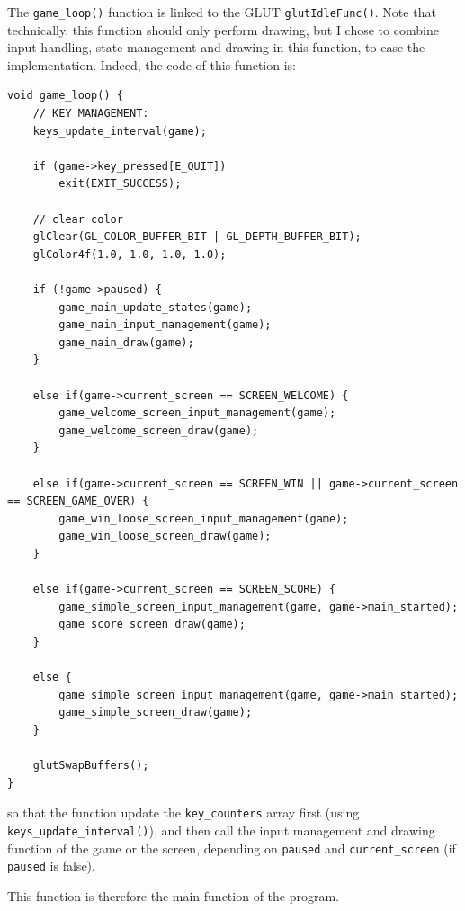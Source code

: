 \documentclass[12pt,a4paper]{article}
\newcommand{\cc}[1]{\texttt{#1}}
\begin{document}
The \cc{game_loop()} function is linked to the GLUT \cc{glutIdleFunc()}. Note that technically, this function should only perform drawing, but I chose to combine input handling, state management and drawing in this function, to ease the implementation. Indeed, the code of this function is:\begin{verbatim}
void game_loop() {
    // KEY MANAGEMENT:
    keys_update_interval(game);

    if (game->key_pressed[E_QUIT])
        exit(EXIT_SUCCESS);

    // clear color
    glClear(GL_COLOR_BUFFER_BIT | GL_DEPTH_BUFFER_BIT);
    glColor4f(1.0, 1.0, 1.0, 1.0);

    if (!game->paused) {
        game_main_update_states(game);
        game_main_input_management(game);
        game_main_draw(game);
    }

    else if(game->current_screen == SCREEN_WELCOME) {
        game_welcome_screen_input_management(game);
        game_welcome_screen_draw(game);
    }

    else if(game->current_screen == SCREEN_WIN || game->current_screen == SCREEN_GAME_OVER) {
        game_win_loose_screen_input_management(game);
        game_win_loose_screen_draw(game);
    }

    else if(game->current_screen == SCREEN_SCORE) {
        game_simple_screen_input_management(game, game->main_started);
        game_score_screen_draw(game);
    }

    else {
        game_simple_screen_input_management(game, game->main_started);
        game_simple_screen_draw(game);
    }

    glutSwapBuffers();
}
\end{verbatim}
so that the function update the \cc{key_counters} array first (using \cc{keys_update_interval()}), and then call the input management and drawing function of the game or the screen, depending on \cc{paused} and \cc{current_screen} (if \cc{paused} is false).

This function is therefore the main function of the program.
\end{document}
